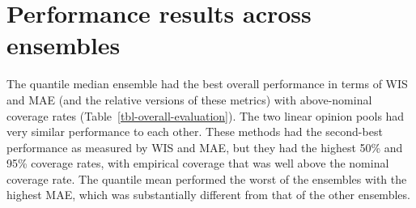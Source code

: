 \documentclass[
  article,
  shortnames,
  notitle]{jss}
\begin{document}
\section{Performance results across
ensembles}\label{performance-results-across-ensembles}

The quantile median ensemble had the best overall performance in terms
of WIS and MAE (and the relative versions of these metrics) with
above-nominal coverage rates (Table~\ref{tbl-overall-evaluation}). The
two linear opinion pools had very similar performance to each other.
These methods had the second-best performance as measured by WIS and
MAE, but they had the highest 50\% and 95\% coverage rates, with
empirical coverage that was well above the nominal coverage rate. The
quantile mean performed the worst of the ensembles with the highest MAE,
which was substantially different from that of the other ensembles.
\end{document}
